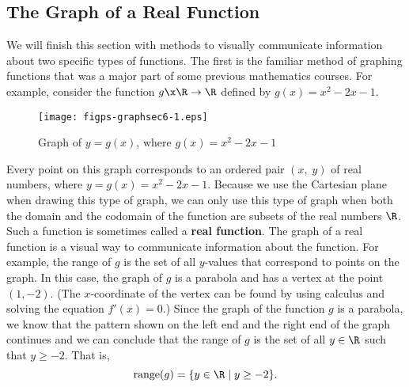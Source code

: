 \subsection*{The Graph of a Real Function}
We will finish this section with methods to visually communicate information about two specific types of functions.  The first is the familiar method of graphing functions that was a major part of some previous mathematics courses.  For example, consider the function $g \x \R \to \R$ defined by $g(x) = x^2 - 2x - 1$.

\begin{figure}[h]
\begin{center}
\texttt{[image: figps-graphsec6-1.eps]} 
\caption{Graph of $y = g( x )$, where  $g( x ) = x^2  - 2x - 1$} \label{fig:functiongraph1}
\end{center}
\end{figure}
Every point on this graph corresponds to an ordered pair  $\left( {x,\;y} \right)$ of real numbers, where  $y = g( x ) = x^2  - 2x - 1$.  Because we use the Cartesian plane when drawing this type of graph, we can only use this type of graph when both the domain and the codomain of the function are subsets of the real numbers  
$\R$.  Such a function is sometimes called a \textbf{real function}.
\label{realfunction}%
%
%
 The graph of a real function is a visual way to communicate information about the function.  For example, the range of $g$ is the set of all  $y$-values  that correspond to points on the graph.  In this case, the graph of $g$ is a parabola and has a vertex at the point $(1, -2)$.  (\note The $x$-coordinate of the vertex can be found by using calculus and solving the equation $f ' (x) = 0$.)  Since the graph of the function $g$ is a parabola, we know that the pattern shown on the left end and the right end of the graph continues and we can conclude that the range of $g$ is the set of all $y \in \R$ such that $y \geq -2$.  That is,
\[
\text{range} (g) = \{ y \in \R \mid y \geq -2 \}.
\]
\hbreak

